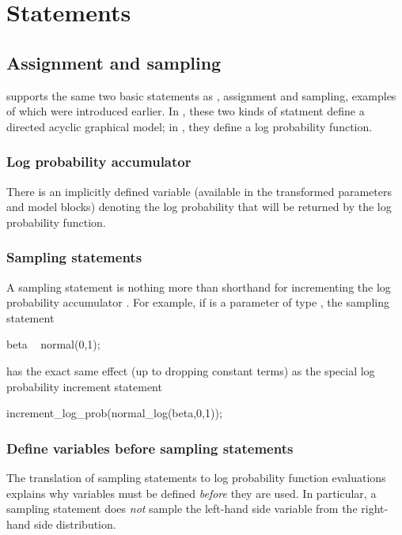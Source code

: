 \documentclass[article]{jss}
\begin{document}
\section{Statements}\label{statements.section}

\subsection{Assignment and sampling}

 supports the same two basic statements as
, assignment and sampling, examples of which were
introduced earlier.  In , these two kinds of statment
define a directed acyclic graphical model; in , they
define a log probability function. 

\subsubsection{Log probability accumulator}

There is an implicitly defined variable  (available in 
the transformed parameters and model blocks) denoting the log
probability that will be returned by the log probability function.  

\subsubsection{Sampling statements}

A sampling statement is nothing more than shorthand for incrementing
the log probability accumulator .  For example, if
 is a parameter of type , the sampling statement
%
\begin{Code}
beta ~ normal(0,1);
\end{Code}
%
has the exact same effect (up to dropping constant terms) as the
special log probability increment statement
%
\begin{Code}
increment_log_prob(normal_log(beta,0,1));
\end{Code}


\subsubsection{Define variables before sampling statements}

The translation of sampling statements to log probability function
evaluations explains why variables must be defined {\it before} they
are used.  In particular, a sampling statement does \emph{not} sample
the left-hand side variable from the right-hand side distribution.
\end{document}

